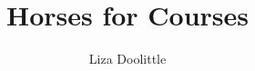 \documentclass[]{memoir}
\title{Horses for Courses}
\author{Liza Doolittle}
\begin{document}
\begin{titlingpage}
\maketitle
\end{titlingpage}
\end{document}

